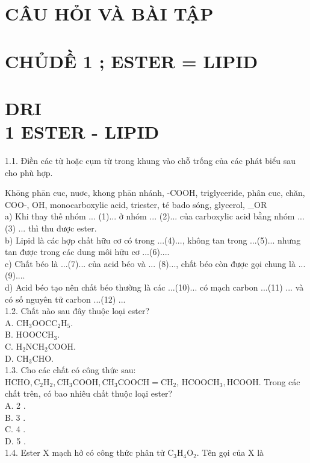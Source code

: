 \documentclass[10pt]{article}
\begin{document}
\captionsetup{singlelinecheck=false}
\section*{CÂU HỎI VÀ BÀI TẬP}
\section*{CHỦDỀ 1 ; ESTER = LIPID}
\section*{DRI \\
 1 ESTER - LIPID}
1.1. Điền các từ hoặc cụm từ trong khung vào chỗ trống của các phát biểu sau cho phù hợp.

Khōng phān cuc, nuơc, khong phān nhánh, -COOH, triglyceride, phân cuc, chăn, COO-, OH, monocarboxylic acid, triester, té bado sóng, glycerol, \_OR\\
a) Khi thay thế nhóm ... (1)... ở nhóm ... (2)... của carboxylic acid bằng nhóm ... (3) ... thì thu được ester.\\
b) Lipid là các hợp chất hữu cơ có trong ...(4)..., không tan trong ...(5)... nhưng tan được trong các dung môi hữu cơ ...(6)....\\
c) Chất béo là ...(7)... của acid béo và ... (8)..., chất béo còn được gọi chung là ...(9)....\\
d) Acid béo tạo nên chất béo thường là các ...(10)... có mạch carbon ...(11) ... và có số nguyên tử carbon ...(12) ...\\
1.2. Chất nào sau đây thuộc loại ester?\\
A. $\mathrm{CH}_{3} \mathrm{OOCC}_{2} \mathrm{H}_{5}$.\\
B. $\mathrm{HOOCCH}_{3}$.\\
C. $\mathrm{H}_{2} \mathrm{NCH}_{2} \mathrm{COOH}$.\\
D. $\mathrm{CH}_{3} \mathrm{CHO}$.\\
1.3. Cho các chất có công thức sau: $\mathrm{HCHO}, \mathrm{C}_{2} \mathrm{H}_{2}, \mathrm{CH}_{3} \mathrm{COOH}, \mathrm{CH}_{3} \mathrm{COOCH}=\mathrm{CH}_{2}$, $\mathrm{HCOOCH}_{3}, \mathrm{HCOOH}$. Trong các chất trên, có bao nhiêu chất thuộc loại ester?\\
A. 2 .\\
B. 3 .\\
C. 4 .\\
D. 5 .\\
1.4. Ester X mạch hở có công thức phân tử $\mathrm{C}_{3} \mathrm{H}_{4} \mathrm{O}_{2}$. Tên gọi của X là\\
\end{document}
